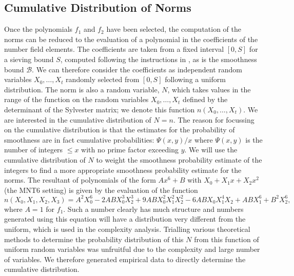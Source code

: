 \documentclass[a4paper, 12pt, envcountsect, runningheads]{llncs}
\numberwithin{figure}{section}
\numberwithin{equation}{section}
\begin{document}
\subsection{Cumulative Distribution of Norms}
\label{ss:norms_dist}
Once the polynomials $f_1$ and $f_2$ have been selected, the computation of the norms can be reduced to the evaluation of a polynomial in the coefficients of the number field elements. The coefficients are taken from a fixed interval $[0,S]$ for a sieving bound $S$, computed following the instructions in \cite{joux-lercier-smart-vercauteren06}, as is the smoothness bound $\mathcal{B}$. We can therefore consider the coefficients as independent random variables $X_0,\ldots,X_t$ randomly selected from $[0,S]$ following a uniform distribution. The norm is also a random variable, $N$, which takes values in the range of the function on the random variables $X_0,\ldots,X_t$ defined by the determinant of the Sylvester matrix; we denote this function $n(X_0,\ldots,X_t)$. We are interested in the cumulative distribution of $N=n$. 
The reason for focussing on the cumulative distribution is that the estimates for the probability of smoothness are in fact cumulative probabilities: $\Psi(x,y)/x$ where $\Psi(x,y)$ is the number of integers $\leq x$ with no prime factor exceeding $y$. We will use the cumulative distribution of $N$ to weight the smoothness probability estimate of the integers to find a more appropriate smoothness probability estimate for the norms.
The resultant of polynomials of the form $Ax^6+B$ with $X_0+X_1 x +X_2 x^2$ (the MNT6 setting) is given by the evaluation of the function {\small{$$n(X_0,X_1,X_2,X_3)=A^2 X_0^6 - 2 A B X_0^3 X_2^3 + 9 A B X_0^2 X_1^2 X_2^2 - 6 A B X_0 X_1^4 X_2 + ABX_1^6 + B^2 X_2^6,$$}} where $A=1$ for $f_1$. Such a number clearly has much structure and numbers generated using this equation will have a distribution very different from the uniform, which is used in the complexity analysis. Trialling various theoretical methods to determine the probability distribution of this $N$ from this function of uniform random variables was unfruitful due to the complexity and large number of variables. We therefore generated empirical data to directly determine the cumulative distribution. 
\end{document}
